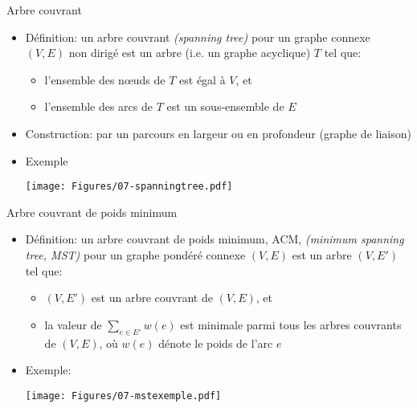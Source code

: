 \begin{frame}{Arbre couvrant}

\begin{itemize}
\item Définition: un \alert{arbre couvrant} {\it (spanning tree)}
  pour un graphe connexe $(V,E)$ non dirigé est un arbre (i.e. un
  graphe acyclique) $T$ tel que:
\begin{itemize}
\item l'ensemble des n\oe uds de $T$ est égal à $V$, et
\item l'ensemble des arcs de $T$ est un sous-ensemble de $E$
\end{itemize}
\item Construction: par un parcours en largeur ou en profondeur (graphe de liaison)
\item Exemple

\bigskip

\centerline{\texttt{[image: Figures/07-spanningtree.pdf]}}

\end{itemize}

\end{frame}

\begin{frame}{Arbre couvrant de poids minimum}
\begin{itemize}
\item Définition: un \alert{arbre couvrant de poids minimum}, ACM, {\it (minimum
  spanning tree, MST)} pour un graphe pondéré connexe $(V,E)$ est un arbre $(V,E')$ tel que:
\begin{itemize}
\item $(V,E')$ est un arbre couvrant de $(V,E)$, et
\item la valeur de $\sum_{e\in E'} w(e)$ est minimale parmi tous les
  arbres couvrants de $(V,E)$, où $w(e)$ dénote le poids de l'arc $e$
\end{itemize}

\bigskip

\item Exemple:
\centerline{\texttt{[image: Figures/07-mstexemple.pdf]}}
\end{itemize}

\end{frame}


